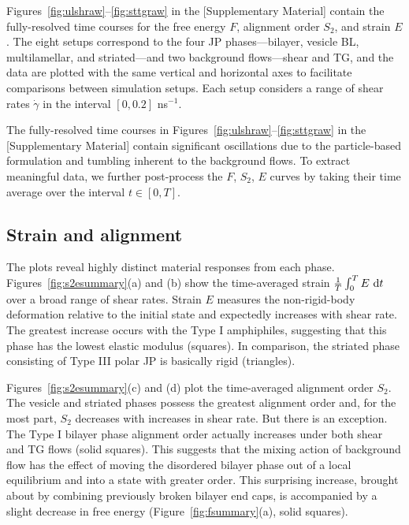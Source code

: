 \documentclass[prb,preprint,showpacs,preprintnumbers,amsmath,amssymb,longbibliography]{revtex4-2}
\begin{document}
Figures~\ref{fig:ulshraw}--\ref{fig:sttgraw} in the [Supplementary
Material] contain the fully-resolved time courses for the free energy
$F$, alignment order $S_2$, and strain $E$. The eight setups correspond
to the four JP phases---bilayer, vesicle BL, multilamellar, and
striated---and two background flows---shear and TG, and the data are
plotted with the same vertical and horizontal axes to facilitate
comparisons between simulation setups. Each setup considers a range of
shear rates $\dot \gamma$ in the interval $[0, 0.2]$ ns$^{-1}$.

The fully-resolved time courses in
Figures~\ref{fig:ulshraw}--\ref{fig:sttgraw} in the [Supplementary
Material] contain significant oscillations due to the particle-based
formulation and tumbling inherent to the background flows. To extract
meaningful data, we further post-process the $F$, $S_2$, $E$ curves by
taking their time average over the interval $t \in [0, T]$. 

\subsection{Strain and alignment}
\label{sec:strain-alignment}
The plots reveal highly distinct material responses from each phase.
Figures~\ref{fig:s2esummary}(a) and (b) show the time-averaged strain
$\frac{1}{T}\int_0^T E \,\dif t$ over a broad range of shear rates.
Strain $E$ measures the non-rigid-body deformation relative to the
initial state and expectedly increases with shear rate. The greatest
increase occurs with the Type I amphiphiles, suggesting that this phase
has the lowest elastic modulus (squares). In comparison, the striated
phase consisting of Type III polar JP is basically rigid (triangles).

Figures~\ref{fig:s2esummary}(c) and (d) plot the time-averaged alignment
order $S_2$. The vesicle and striated phases possess the greatest
alignment order and, for the most part, $S_2$ decreases with increases
in shear rate. But there is an exception. The Type I bilayer phase
alignment order actually increases under both shear and TG flows (solid
squares). This suggests that the mixing action of background flow has
the effect of moving the disordered bilayer phase out of a local
equilibrium and into a state with greater order. This surprising
increase, brought about by combining previously broken bilayer end caps,
is accompanied by a slight decrease in free energy
(Figure~\ref{fig:fsummary}(a), solid squares).
\end{document}
